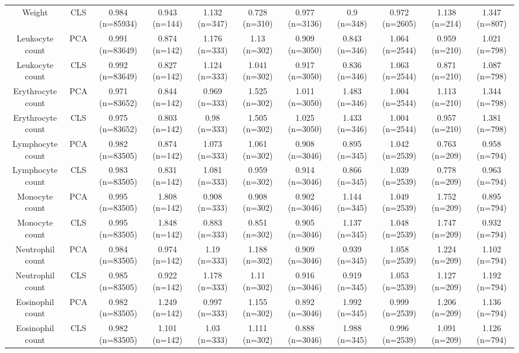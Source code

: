 \begin{landscape}
\begin{table}[!htbp]
\begin{tabular}{ ccccccccccc}
Weight & CLS & 0.984 (n=85934) & 0.943 (n=144) & 1.132 (n=347) & 0.728 (n=310) & 0.977 (n=3136) & 0.9 (n=348) & 0.972 (n=2605) & 1.138 (n=214) & 1.347 (n=807) \\ 
Leukocyte count & PCA & 0.991 (n=83649) & 0.874 (n=142) & 1.176 (n=333) & 1.13 (n=302) & 0.909 (n=3050) & 0.843 (n=346) & 1.064 (n=2544) & 0.959 (n=210) & 1.021 (n=798) \\ 
Leukocyte count & CLS & 0.992 (n=83649) & 0.827 (n=142) & 1.124 (n=333) & 1.041 (n=302) & 0.917 (n=3050) & 0.836 (n=346) & 1.063 (n=2544) & 0.871 (n=210) & 1.087 (n=798) \\ 
Erythrocyte count & PCA & 0.971 (n=83652) & 0.844 (n=142) & 0.969 (n=333) & 1.525 (n=302) & 1.011 (n=3050) & 1.483 (n=346) & 1.004 (n=2544) & 1.113 (n=210) & 1.344 (n=798) \\ 
Erythrocyte count & CLS & 0.975 (n=83652) & 0.803 (n=142) & 0.98 (n=333) & 1.505 (n=302) & 1.025 (n=3050) & 1.433 (n=346) & 1.004 (n=2544) & 0.957 (n=210) & 1.381 (n=798) \\ 
Lymphocyte count & PCA & 0.982 (n=83505) & 0.874 (n=142) & 1.073 (n=333) & 1.061 (n=302) & 0.908 (n=3046) & 0.895 (n=345) & 1.042 (n=2539) & 0.763 (n=209) & 0.958 (n=794) \\ 
Lymphocyte count & CLS & 0.983 (n=83505) & 0.831 (n=142) & 1.081 (n=333) & 0.959 (n=302) & 0.914 (n=3046) & 0.866 (n=345) & 1.039 (n=2539) & 0.778 (n=209) & 0.963 (n=794) \\ 
Monocyte count & PCA & 0.995 (n=83505) & 1.808 (n=142) & 0.908 (n=333) & 0.908 (n=302) & 0.902 (n=3046) & 1.144 (n=345) & 1.049 (n=2539) & 1.752 (n=209) & 0.895 (n=794) \\ 
Monocyte count & CLS & 0.995 (n=83505) & 1.848 (n=142) & 0.883 (n=333) & 0.851 (n=302) & 0.905 (n=3046) & 1.137 (n=345) & 1.048 (n=2539) & 1.747 (n=209) & 0.932 (n=794) \\ 
Neutrophil count & PCA & 0.984 (n=83505) & 0.974 (n=142) & 1.19 (n=333) & 1.188 (n=302) & 0.909 (n=3046) & 0.939 (n=345) & 1.058 (n=2539) & 1.224 (n=209) & 1.102 (n=794) \\ 
Neutrophil count & CLS & 0.985 (n=83505) & 0.922 (n=142) & 1.178 (n=333) & 1.11 (n=302) & 0.916 (n=3046) & 0.919 (n=345) & 1.053 (n=2539) & 1.127 (n=209) & 1.192 (n=794) \\ 
Eosinophil count & PCA & 0.982 (n=83505) & 1.249 (n=142) & 0.997 (n=333) & 1.155 (n=302) & 0.892 (n=3046) & 1.992 (n=345) & 0.999 (n=2539) & 1.206 (n=209) & 1.136 (n=794) \\ 
Eosinophil count & CLS & 0.982 (n=83505) & 1.101 (n=142) & 1.03 (n=333) & 1.111 (n=302) & 0.888 (n=3046) & 1.988 (n=345) & 0.996 (n=2539) & 1.091 (n=209) & 1.126 (n=794) \\ 

\end{tabular}
\end{table}
\end{landscape}
